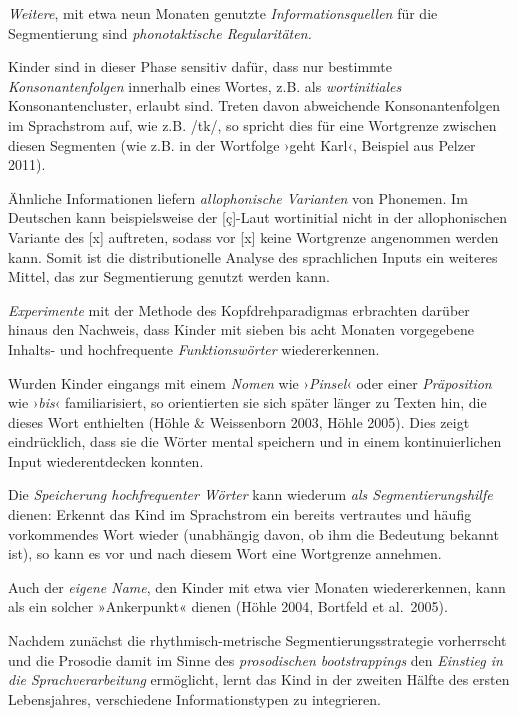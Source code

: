 \documentclass[
  letterpaper,
]{scrbook}
\begin{document}
\emph{Weitere}, mit etwa neun Monaten genutzte
\emph{Informationsquellen} für die Segmentierung sind
\emph{phonotaktische Regularitäten.}

Kinder sind in dieser Phase sensitiv dafür, dass nur bestimmte
\emph{Konsonantenfolgen} innerhalb eines Wortes, z.B. als
\emph{wortinitiales} Konsonantencluster, erlaubt sind. Treten davon
abweichende Konsonantenfolgen im Sprachstrom auf, wie z.B. /tk/, so
spricht dies für eine Wortgrenze zwischen diesen Segmenten (wie z.B. in
der Wortfolge ›geht Karl‹, Beispiel aus Pelzer 2011).

Ähnliche Informationen liefern \emph{allophonische Varianten} von
Phonemen. Im Deutschen kann beispielsweise der {[}ç{]}-Laut wortinitial
nicht in der allophonischen Variante des {[}x{]} auftreten, sodass vor
{[}x{]} keine Wortgrenze angenommen werden kann. Somit ist die
distributionelle Analyse des sprachlichen Inputs ein weiteres Mittel,
das zur Segmentierung genutzt werden kann.

\emph{Experimente} mit der Methode des Kopfdrehparadigmas erbrachten
darüber hinaus den Nachweis, dass Kinder mit sieben bis acht Monaten
vorgegebene Inhalts- und hochfrequente \emph{Funktionswörter}
wiedererkennen.

Wurden Kinder eingangs mit einem \emph{Nomen} wie ›\emph{Pinsel}‹ oder
einer \emph{Präposition} wie ›\emph{bis}‹ familiarisiert, so
orientierten sie sich später länger zu Texten hin, die dieses Wort
enthielten (Höhle \& Weissenborn 2003, Höhle 2005). Dies zeigt
eindrücklich, dass sie die Wörter mental speichern und in einem
kontinuierlichen Input wiederentdecken konnten.

Die \emph{Speicherung hochfrequenter Wörter} kann wiederum \emph{als
Segmentierungshilfe} dienen: Erkennt das Kind im Sprachstrom ein bereits
vertrautes und häufig vorkommendes Wort wieder (unabhängig davon, ob ihm
die Bedeutung bekannt ist), so kann es vor und nach diesem Wort eine
Wortgrenze annehmen.

Auch der \emph{eigene Name}, den Kinder mit etwa vier Monaten
wiedererkennen, kann als ein solcher »Ankerpunkt« dienen (Höhle 2004,
Bortfeld et al.~2005).

Nachdem zunächst die rhythmisch-metrische Segmentierungsstrategie
vorherrscht und die Prosodie damit im Sinne des \emph{prosodischen
bootstrappings} den \emph{Einstieg in die Sprachverarbeitung}
ermöglicht, lernt das Kind in der zweiten Hälfte des ersten
Lebensjahres, verschiedene Informationstypen zu integrieren.
\end{document}
